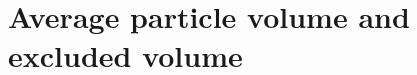\documentclass[journal=jacsat,manuscript=article]{achemso}
\begin{document}

\section{Average particle volume and excluded volume}
\end{document}
